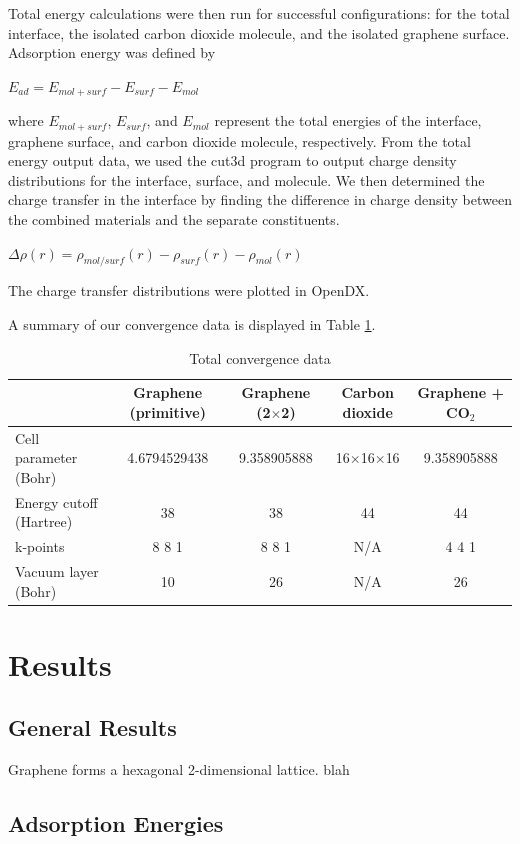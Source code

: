 \documentclass[journal=jacsat,manuscript=article]{achemso}
\begin{document}
Total energy calculations were then run for successful configurations: for the total interface, 
the isolated carbon dioxide molecule, 
and the isolated graphene surface. Adsorption energy was defined by

$E_{ad} = E_{mol+surf} - E_{surf} - E_{mol}$

where $E_{mol+surf}$, $E_{surf}$, and $E_{mol}$ represent the total energies of the interface, graphene surface, and carbon dioxide molecule, respectively. 
From the total energy output data, 
we used the cut3d program to output charge density distributions for the interface, surface, and molecule. 
We then determined the charge transfer in the interface by finding the difference in charge density between the combined materials and the separate constituents. 


$\Delta \rho(r) = \rho_{mol/surf}(r) - \rho_{surf}(r) - \rho_{mol}(r)$

The charge transfer distributions were plotted in OpenDX.

A summary of our convergence data is displayed in Table \ref{total}.


\begin{table}[hpt]
\caption{Total convergence data}
\begin{tabular}{l c  c  c  c}
 &Graphene (primitive)&Graphene (2$\times$2)&Carbon dioxide&Graphene + CO$_{2}$\\
\hline
\hline
Cell parameter (Bohr)&4.6794529438&9.358905888&16$\times$16$\times$16&9.358905888\\
Energy cutoff (Hartree)&38&38&44&44\\
k-points&8 8 1&8 8 1&N/A&4 4 1\\
Vacuum layer (Bohr)&10&26&N/A&26\\
\end{tabular}
\label{total}
\end{table}


\section{Results}

\subsection{General Results}

Graphene forms a hexagonal 2-dimensional lattice. blah
 

\subsection{Adsorption Energies}
\end{document}
